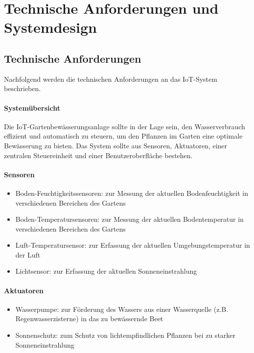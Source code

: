 
\section{Technische Anforderungen und Systemdesign}

\subsection{Technische Anforderungen}
Nachfolgend werden die technischen Anforderungen an das IoT-System beschrieben.

\paragraph{Systemübersicht}
Die IoT-Gartenbewässerungsanlage sollte in der Lage sein, den Wasserverbrauch effizient und automatisch zu steuern, um den Pflanzen im Garten eine optimale Bewässerung zu bieten. Das System sollte aus Sensoren, Aktuatoren, einer zentralen Steuereinheit und einer Benutzeroberfläche bestehen.

\paragraph{Sensoren}
\begin{itemize}
\item Boden-Feuchtigkeitssensoren: zur Messung der aktuellen Bodenfeuchtigkeit in verschiedenen Bereichen des Gartens
\item Boden-Temperatursensoren: zur Messung der aktuellen Bodentemperatur in verschiedenen Bereichen des Gartens
\item Luft-Temperatursensor: zur Erfassung der aktuellen Umgebungstemperatur in der Luft
\item Lichtsensor: zur Erfassung der aktuellen Sonneneinstrahlung
\end{itemize}

\paragraph{Aktuatoren}
\begin{itemize}
\item Wasserpumpe: zur Förderung des Wassers aus einer Wasserquelle (z.B. Regenwasserzisterne) in das zu bewässernde Beet
\item Sonnenschutz: zum Schutz von lichtempfindlichen Pflanzen bei zu starker Sonneneinstrahlung 
\end{itemize}


